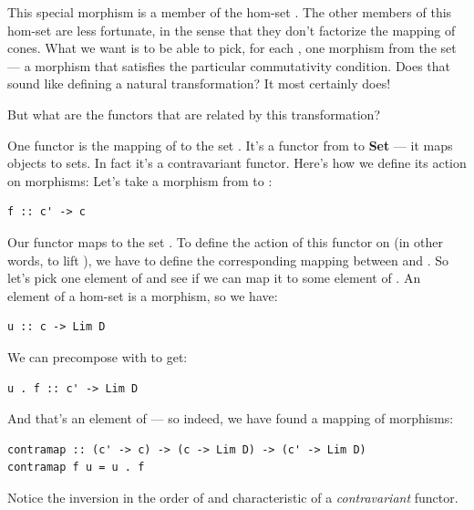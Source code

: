 This special morphism is a member of the hom-set .
The other members of this hom-set are less fortunate, in the sense that
they don't factorize the mapping of cones. What we want is to be able to
pick, for each , one morphism from the set
 --- a morphism that satisfies the particular
commutativity condition. Does that sound like defining a natural
transformation? It most certainly does!

But what are the functors that are related by this transformation?

One functor is the mapping of  to the set
. It's a functor from  to \textbf{Set} ---
it maps objects to sets. In fact it's a contravariant functor. Here's
how we define its action on morphisms: Let's take a morphism 
from  to :

\begin{Verbatim}[commandchars=\\\{\}]
f :: c' -> c
\end{Verbatim}
Our functor maps  to the set
. To define the action of this functor on
 (in other words, to lift ), we have to define the
corresponding mapping between  and
. So let's pick one element  of
 and see if we can map it to some element of
. An element of a hom-set is a morphism, so
we have:

\begin{Verbatim}[commandchars=\\\{\}]
u :: c -> Lim D
\end{Verbatim}
We can precompose  with  to get:

\begin{Verbatim}[commandchars=\\\{\}]
u . f :: c' -> Lim D
\end{Verbatim}
And that's an element of --- so indeed, we
have found a mapping of morphisms:

\begin{Verbatim}[commandchars=\\\{\}]
contramap :: (c' -> c) -> (c -> Lim D) -> (c' -> Lim D) 
contramap f u = u . f
\end{Verbatim}
Notice the inversion in the order of  and 
characteristic of a \emph{contravariant} functor.

\begin{figure}[H]
\centering
{}
\end{figure}


